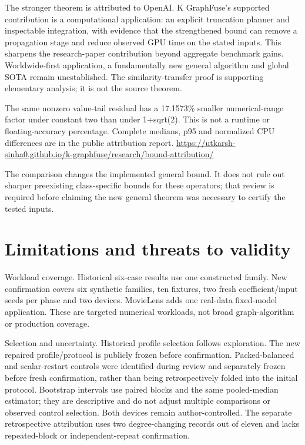\documentclass[10pt]{article}
\begin{document}
The stronger theorem is attributed to OpenAI. K GraphFuse's supported contribution is a computational application: an explicit truncation planner and inspectable integration, with evidence that the strengthened bound can remove a propagation stage and reduce observed GPU time on the stated inputs. This sharpens the research-paper contribution beyond aggregate benchmark gains. Worldwide-first application, a fundamentally new general algorithm and global SOTA remain unestablished. The similarity-transfer proof is supporting elementary analysis; it is not the source theorem.

The same nonzero value-tail residual has a 17.1573\% smaller numerical-range factor under constant two than under 1+sqrt(2). This is not a runtime or floating-accuracy percentage. Complete medians, p95 and normalized CPU differences are in the public attribution report.
\url{https://utkarsh-sinha0.github.io/k-graphfuse/research/bound-attribution/}

The comparison changes the implemented general bound. It does not rule out sharper preexisting class-specific bounds for these operators; that review is required before claiming the new general theorem was necessary to certify the tested inputs.

\section{Limitations and threats to validity}

Workload coverage. Historical six-case results use one constructed family. New confirmation covers six synthetic families, ten fixtures, two fresh coefficient/input seeds per phase and two devices. MovieLens adds one real-data fixed-model application. These are targeted numerical workloads, not broad graph-algorithm or production coverage.

Selection and uncertainty. Historical profile selection follows exploration. The new repaired profile/protocol is publicly frozen before confirmation. Packed-balanced and scalar-restart controls were identified during review and separately frozen before fresh confirmation, rather than being retrospectively folded into the initial protocol. Bootstrap intervals use paired blocks and the same pooled-median estimator; they are descriptive and do not adjust multiple comparisons or observed control selection. Both devices remain author-controlled. The separate retrospective attribution uses two degree-changing records out of eleven and lacks repeated-block or independent-repeat confirmation.
\end{document}
